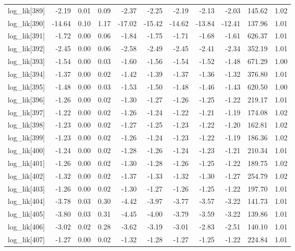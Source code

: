 \begin{table}[ht]
\begin{tabular}{rrrrrrrrrrr}
  log\_lik[389] & -2.19 & 0.01 & 0.09 & -2.37 & -2.25 & -2.19 & -2.13 & -2.03 & 145.62 & 1.02 \\ 
  log\_lik[390] & -14.64 & 0.10 & 1.17 & -17.02 & -15.42 & -14.62 & -13.84 & -12.41 & 137.96 & 1.01 \\ 
  log\_lik[391] & -1.72 & 0.00 & 0.06 & -1.84 & -1.75 & -1.71 & -1.68 & -1.61 & 626.37 & 1.01 \\ 
  log\_lik[392] & -2.45 & 0.00 & 0.06 & -2.58 & -2.49 & -2.45 & -2.41 & -2.34 & 352.19 & 1.01 \\ 
  log\_lik[393] & -1.54 & 0.00 & 0.03 & -1.60 & -1.56 & -1.54 & -1.52 & -1.48 & 671.29 & 1.00 \\ 
  log\_lik[394] & -1.37 & 0.00 & 0.02 & -1.42 & -1.39 & -1.37 & -1.36 & -1.32 & 376.80 & 1.01 \\ 
  log\_lik[395] & -1.48 & 0.00 & 0.03 & -1.53 & -1.50 & -1.48 & -1.46 & -1.43 & 620.50 & 1.00 \\ 
  log\_lik[396] & -1.26 & 0.00 & 0.02 & -1.30 & -1.27 & -1.26 & -1.25 & -1.22 & 219.17 & 1.01 \\ 
  log\_lik[397] & -1.22 & 0.00 & 0.02 & -1.26 & -1.24 & -1.22 & -1.21 & -1.19 & 174.08 & 1.02 \\ 
  log\_lik[398] & -1.23 & 0.00 & 0.02 & -1.27 & -1.25 & -1.23 & -1.22 & -1.20 & 162.81 & 1.02 \\ 
  log\_lik[399] & -1.23 & 0.00 & 0.02 & -1.26 & -1.24 & -1.23 & -1.22 & -1.19 & 186.36 & 1.02 \\ 
  log\_lik[400] & -1.24 & 0.00 & 0.02 & -1.28 & -1.26 & -1.24 & -1.23 & -1.21 & 210.34 & 1.01 \\ 
  log\_lik[401] & -1.26 & 0.00 & 0.02 & -1.30 & -1.28 & -1.26 & -1.25 & -1.22 & 189.75 & 1.02 \\ 
  log\_lik[402] & -1.32 & 0.00 & 0.02 & -1.37 & -1.33 & -1.32 & -1.30 & -1.27 & 254.79 & 1.02 \\ 
  log\_lik[403] & -1.26 & 0.00 & 0.02 & -1.30 & -1.27 & -1.26 & -1.25 & -1.22 & 197.70 & 1.01 \\ 
  log\_lik[404] & -3.78 & 0.03 & 0.30 & -4.42 & -3.97 & -3.77 & -3.57 & -3.22 & 141.73 & 1.01 \\ 
  log\_lik[405] & -3.80 & 0.03 & 0.31 & -4.45 & -4.00 & -3.79 & -3.59 & -3.22 & 139.86 & 1.01 \\ 
  log\_lik[406] & -3.02 & 0.02 & 0.28 & -3.62 & -3.19 & -3.01 & -2.83 & -2.51 & 140.10 & 1.01 \\ 
  log\_lik[407] & -1.27 & 0.00 & 0.02 & -1.32 & -1.28 & -1.27 & -1.25 & -1.22 & 224.84 & 1.01 \\ 

\end{tabular}
\end{table}
